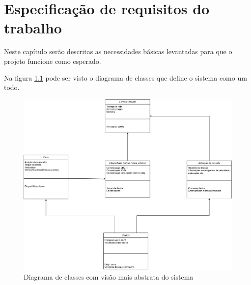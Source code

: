 \chapter{Especificação de requisitos do trabalho}

\label{CAP4}



Neste capítulo serão descritas as necessidades básicas levantadas para que o projeto funcione como esperado.

Na figura \ref{fig:class_diagram} pode ser visto o diagrama de classes que define o sistema como um todo.

\begin{figure}[hp]
    \centering
    
    \includegraphics[scale=0.4]{figures/coleta_dados_carro}
    
    \caption{Diagrama de classes com visão mais abstrata do sistema}
    
    \label{fig:class_diagram}
\end{figure}

